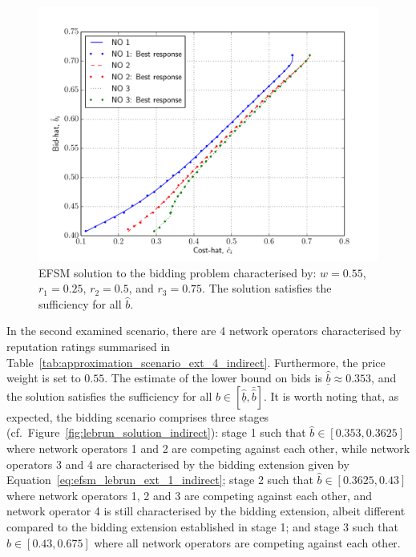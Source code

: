 \begin{figure}[t]
  \includegraphics[width=\figsize]{Indirect/Figures/efs_3_sufficiency}
  \caption{EFSM solution to the bidding problem characterised by: $w=0.55$, $r_1 = 0.25$, $r_2 = 0.5$, and $r_3 = 0.75$. The solution satisfies the sufficiency for all $\hat{b}$.}
  \label{fig:efs_3_sufficiency_indirect}
\end{figure}

In the second examined scenario, there are 4 network operators characterised by reputation ratings summarised in Table~\ref{tab:approximation_scenario_ext_4_indirect}. Furthermore, the price weight is set to $0.55$.  The estimate of the lower bound on bids is $\underline{\hat{b}}\approx 0.353$, and the solution satisfies the sufficiency for all $b\in[\underline{\hat{b}},\bar{\hat{b}}]$. It is worth noting that, as expected, the bidding scenario comprises three stages (cf.~Figure~\ref{fig:lebrun_solution_indirect}): stage 1 such that $\hat{b}\in [0.353, 0.3625]$ where network operators 1 and 2 are competing against each other, while network operators 3 and 4 are characterised by the bidding extension given by Equation~\eqref{eq:efsm_lebrun_ext_1_indirect}; stage 2 such that $\hat{b}\in [0.3625, 0.43]$ where network operators 1, 2 and 3 are competing against each other, and network operator 4 is still characterised by the bidding extension, albeit different compared to the bidding extension established in stage 1; and stage 3 such that $\hat{b}\in [0.43, 0.675]$ where all network operators are competing against each other.

